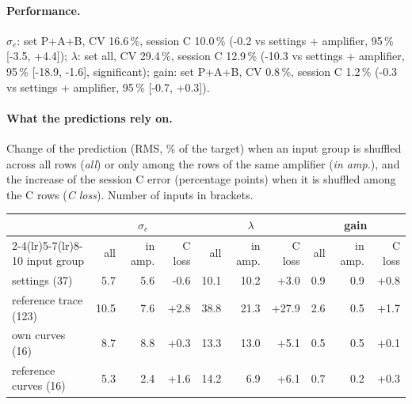 \paragraph{Performance.}
$\sigma_e$: set P+A+B, CV 16.6\,\%, session C 10.0\,\% (-0.2 vs settings + amplifier, 95\,\% [-3.5, +4.4]); $\lambda$: set all, CV 29.4\,\%, session C 12.9\,\% (-10.3 vs settings + amplifier, 95\,\% [-18.9, -1.6], significant); gain: set P+A+B, CV 0.8\,\%, session C 1.2\,\% (-0.3 vs settings + amplifier, 95\,\% [-0.7, +0.3]).
\paragraph{What the predictions rely on.} Change of the prediction (RMS, \% of the target) when an input group is shuffled across all rows (\emph{all}) or only among the rows of the same amplifier (\emph{in amp.}), and the increase of the session C error (percentage points) when it is shuffled among the C rows (\emph{C loss}). Number of inputs in brackets.
\begin{center}\footnotesize
\begin{tabular}{lrrrrrrrrr}
\toprule
 & \multicolumn{3}{c}{$\sigma_e$} & \multicolumn{3}{c}{$\lambda$} & \multicolumn{3}{c}{gain} \\
\cmidrule(lr){2-4}\cmidrule(lr){5-7}\cmidrule(lr){8-10}
input group & all & in amp. & C loss & all & in amp. & C loss & all & in amp. & C loss \\
\midrule
settings (37) & 5.7 & 5.6 & -0.6 & 10.1 & 10.2 & +3.0 & 0.9 & 0.9 & +0.8 \\
reference trace (123) & 10.5 & 7.6 & +2.8 & 38.8 & 21.3 & +27.9 & 2.6 & 0.5 & +1.7 \\
own curves (16) & 8.7 & 8.8 & +0.3 & 13.3 & 13.0 & +5.1 & 0.5 & 0.5 & +0.1 \\
reference curves (16) & 5.3 & 2.4 & +1.6 & 14.2 & 6.9 & +6.1 & 0.7 & 0.2 & +0.3 \\
\bottomrule
\end{tabular}
\end{center}

